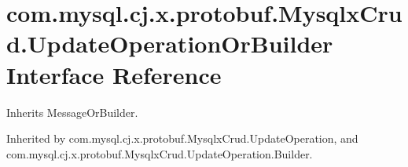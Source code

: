 \hypertarget{interfacecom_1_1mysql_1_1cj_1_1x_1_1protobuf_1_1_mysqlx_crud_1_1_update_operation_or_builder}{}\section{com.\+mysql.\+cj.\+x.\+protobuf.\+Mysqlx\+Crud.\+Update\+Operation\+Or\+Builder Interface Reference}
\label{interfacecom_1_1mysql_1_1cj_1_1x_1_1protobuf_1_1_mysqlx_crud_1_1_update_operation_or_builder}


Inherits Message\+Or\+Builder.



Inherited by com.\+mysql.\+cj.\+x.\+protobuf.\+Mysqlx\+Crud.\+Update\+Operation, and com.\+mysql.\+cj.\+x.\+protobuf.\+Mysqlx\+Crud.\+Update\+Operation.\+Builder.

